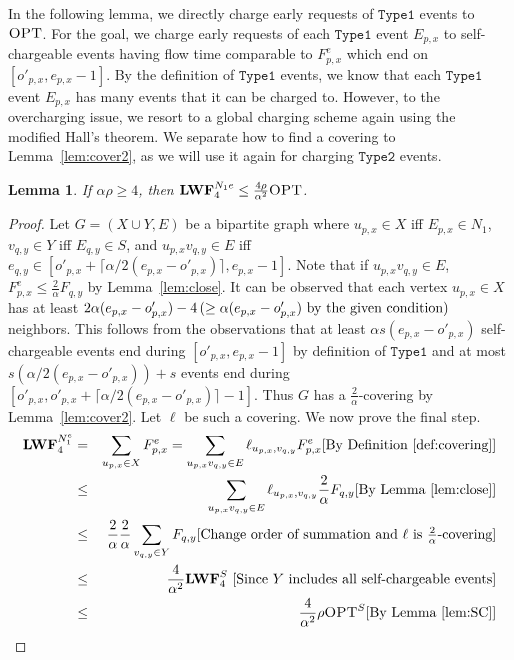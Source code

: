 \documentclass[11pt]{article}
\newtheorem{lemma}{Lemma}[section]
\newcommand{\opt}{\textrm{\sc OPT}}
\newcommand{\one}{\texttt{Type1}}
\newcommand{\two}{\texttt{Type2}}
\newcommand{\len}{\mathfrak{\rho}}
\newcommand{\fe}{F^e}
\newcommand{\lwfs}{\lwf^{S}}
\newcommand{\lwfneone}{\lwf^{N_1^e}}
\newcommand{\opts}{\opt^{S}}
\begin{document}
\begin{titlepage}
In the following lemma, we directly charge early requests of $\one$ events to $\opt$. For the goal, we charge early
requests of each $\one$ event $E_{p,x}$ to self-chargeable events having flow time comparable to $\fe_{p,x}$ which end
on $[o'_{p,x}, e_{p,x} - 1]$. By the definition of $\one$ events, we know that each $\one$ event $E_{p,x}$ has many
events that it can be charged to. However, to the overcharging issue, we resort to a global charging scheme again using
the modified Hall's theorem. We separate how to find a covering to Lemma~\ref{lem:cover2}, as we will use it again for
charging $\two$ events.


\begin{lemma}
\label{lem:type1} If $\alpha \len \geq 4$, then $\lwf^{N_1e}_4 \leq \frac{4 \len}{ \alpha^2} \opt$.
\end{lemma}
\begin{proof}
  Let $G=(X \cup Y,E)$ be a bipartite graph where $u_{p,x} \in
  X$ iff $E_{p,x} \in N_1$, $v_{q,y} \in Y$ iff $E_{q,y} \in S$, and
  $u_{p,x}v_{q,y} \in E$ iff $e_{q,y} \in [o'_{p,x} + \lceil \alpha/2
  (e_{p,x} - o'_{p,x}) \rceil, e_{p,x}-1]$.
Note that if $u_{p,x}v_{q,y} \in E$, $\fe_{p,x} \leq \frac{2}{\alpha}F_{q,y}$ by Lemma~\ref{lem:close}.
  It can be observed that each vertex
  $u_{p,x} \in X$ has at least $2\alpha (e_{p,x} -
  o'_{p,x})-4 \,( \geq \alpha (e_{p,x} - o'_{p,x})\,\,\textnormal{by the given condition})$ neighbors.
  This follows from the observations that at least $\alpha s(e_{p,x} - o'_{p,x})$ self-chargeable
  events end during $[o'_{p,x}, e_{p,x}-1]$ by definition of $\one$ and
  at most $s(\alpha/2(e_{p,x} - o'_{p,x}))+s$ events end
  during $[o'_{p,x}, o'_{p,x} + \lceil \alpha/2 (e_{p,x} - o'_{p,x}) \rceil -1]$. Thus
  $G$ has a $\frac{2}{\alpha}$-covering by Lemma~\ref{lem:cover2}. Let
  $\ell$ be such a covering. We now prove the final step.
\begin{eqnarray*}
\lwfneone_{4}
&=   &  \sum_{u_{p,x} \in X} \fe_{p,x} = \sum_{u_{p,x}v_{q,y} \in E} \ell_{u_{p,x},v_{q,y}}  \fe_{p,x} \mbox{[By Definition~\ref{def:covering}]}  \\
&\leq&  \sum_{u_{p,x}v_{q,y} \in E} \ell_{u_{p,x},v_{q,y}} \frac{2}{\alpha}F_{q, y} \mbox{[By Lemma~\ref{lem:close}]}  \\
&\leq& \frac{2}{\alpha} \frac{2}{\alpha} \sum_{v_{q ,y} \in Y} F_{q, y}    \mbox{[Change order of summation and $\ell$ is $\frac{2}{\alpha}$-covering]}  \\
&\leq& \frac{4}{ \alpha^2 } \lwfs_4 \mbox{ [Since $Y$ includes all self-chargeable events]}  \\
&\leq& \frac{4}{ \alpha^2 } \len \opts \mbox{[By Lemma~\ref{lem:SC}]}
\end{eqnarray*}
\end{proof}


\end{titlepage}
\end{document}
